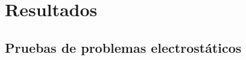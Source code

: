 \documentclass[xcolor=table,serif]{beamer}
\begin{document}
\section{Resultados}
	\subsection{Pruebas de problemas electrostáticos}
	
\end{document}
